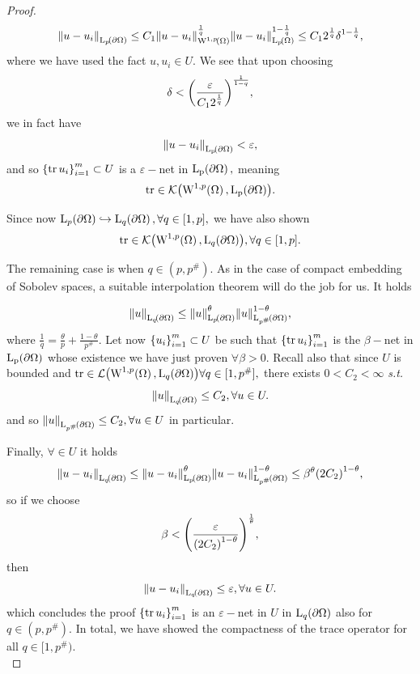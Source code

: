 \documentclass{article}
\begin{document}
\begin{proof}
\[
	\norm{u-u_i}_{\LpSet[p]{\partial \Omega}} \leq C_1 \norm{u-u_i}_{\WkpSet[1][p]{\Omega}}^{\frac{1}{q}}\norm{u-u_i}_{\LpSet[p]{\Omega}}^{1- \frac{1}{q}}\leq C_1 2^{\frac{1}{q}} \delta^{1-\frac{1}{q}},
\]
where we have used the fact $u, u_i \in U.$ We see that upon choosing
\[
	\delta < \qty(\frac{\varepsilon}{C_1 2^{\frac{1}{q}}})^{\frac{1}{1-q}},
\]
we in fact have
\[
	\norm{u-u_i}_{\LpSet{\partial \Omega}} < \varepsilon,
\]
and so $\qty{\trace u_i}_{i=1}^m \subset U$ is a $\varepsilon-$net in $\LpSet{\partial \Omega},$ meaning
\[
	\trace \in \mathcal{K}\qty(\WkpSet[1][p]{\Omega}, \LpSet{\partial \Omega}).
\]

Since now $\LpSet[p]{\partial \Omega} \hookrightarrow \LpSet[q]{\partial \Omega}, \forall q \in [1,p],$ we have also shown
\[
	\trace \in \mathcal{K}\qty(\WkpSet[1][p]{\Omega}, \LpSet[q]{\partial \Omega}), \forall q \in [1,p].
\]

The remaining case is when $q \in (p, p^{\#}).$ As in the case of compact embedding of Sobolev spaces, a suitable interpolation theorem will do the job for us. It holds

\[
	\norm{u}_{\LpSet[q]{\partial \Omega}}\leq \norm{u}_{\LpSet[p]{\partial \Omega}}^{\theta} \norm{u}_{\LpSet[p^{\#}]{\partial \Omega}}^{1-\theta},
\]
where $\frac{1}{q} = \frac{\theta}{p} + \frac{1-\theta}{p^{\#}}.$ Let now $\qty{u_i}_{i=1}^m \subset U$ be such that $\qty{\trace u_i}_{i=1}^m$ is the $\beta-$net in $\LpSet{\partial \Omega}$ whose existence we have just proven $\forall \beta >0.$ Recall also that since $U$ is bounded and $\trace \in \mathcal{L}\qty(\WkpSet[1][p]{\Omega}, \LpSet[q]{\partial \Omega}) \forall q \in [1,p^{\#}],$ there exists $0< C_2 < \infty$ \textit{s.t.}
\[
	\norm{u}_{\LpSet[q]{\partial \Omega}} \leq C_2, \forall u \in U.
\]
and so $\norm{u}_{\LpSet[p^{\#}]{\partial \Omega}} \leq C_2, \forall u \in U$ in particular.

Finally, $\forall \in U$ it holds
\[
	\norm{u-u_i}_{\LpSet[q]{\partial \Omega}} \leq \norm{u-u_i}_{\LpSet{\partial \Omega}}^{\theta}\norm{u-u_i}_{\LpSet[p^{\#}]{\partial \Omega}}^{1-\theta} \leq \beta^{\theta}\qty(2C_2)^{1-\theta},
\]
so if we choose
\[
	\beta <\qty(\frac{\varepsilon}{\qty(2C_2)^{1-\theta}})^{\frac{1}{\theta}},
\]
then
\[
	\norm{u-u_i}_{\LpSet[q]{\partial \Omega}} \leq \varepsilon, \forall u \in U.
\]
which concludes the proof $\qty{\trace u_i}_{i=1}^m$ is an $\varepsilon-$net in $U$ in $\LpSet[q]{\partial \Omega}$ also for $q \in (p,p^{\#})$. In total, we have showed the compactness of the trace operator for all $q \in [1, p^{\#}).$\\


\end{proof}
\end{document}
